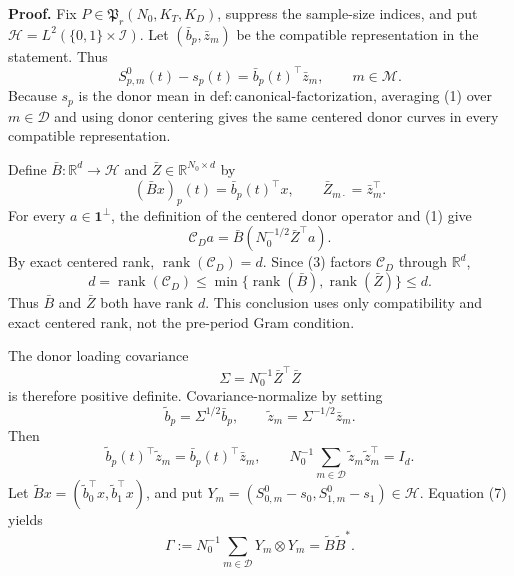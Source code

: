 \textbf{Proof.}
Fix \(P\in\mathfrak P_r(N_0,K_T,K_D)\), suppress the sample-size indices, and
put \(\mathcal H=L^2(\{0,1\}\times\mathcal I)\).  Let
\((\bar b_p,\bar z_m)\) be the compatible representation in the statement.  Thus
\[
 S^0_{p,m}(t)-s_p(t)=\bar b_p(t)^\top\bar z_m,
 \qquad m\in\mathcal M.                                   \tag{1}
\]
Because \(s_p\) is the donor mean in
\(\mathrm{def:canonical\mbox{-}factorization}\), averaging (1) over
\(m\in\mathcal D\) and using donor centering gives the same centered donor
curves in every compatible representation.

Define \(\bar B:\mathbb R^d\to\mathcal H\) and
\(\bar Z\in\mathbb R^{N_0\times d}\) by
\[
 (\bar Bx)_p(t)=\bar b_p(t)^\top x,
 \qquad \bar Z_{m\cdot}=\bar z_m^\top.                    \tag{2}
\]
For every \(a\in\mathbf 1^\perp\), the definition of the centered donor
operator and (1) give
\[
 \mathcal C_Da
 =\bar B\left(N_0^{-1/2}\bar Z^\top a\right).             \tag{3}
\]
By exact centered rank, \(\operatorname{rank}(\mathcal C_D)=d\).  Since (3)
factors \(\mathcal C_D\) through \(\mathbb R^d\),
\[
 d=\operatorname{rank}(\mathcal C_D)
 \leq\min\{\operatorname{rank}(\bar B),
             \operatorname{rank}(\bar Z)\}\leq d.        \tag{4}
\]
Thus \(\bar B\) and \(\bar Z\) both have rank \(d\).  This conclusion uses
only compatibility and exact centered rank, not the pre-period Gram condition.

The donor loading covariance
\[
 \Sigma=N_0^{-1}\bar Z^\top\bar Z                         \tag{5}
\]
is therefore positive definite.  Covariance-normalize by setting
\[
 \widetilde b_p=\Sigma^{1/2}\bar b_p,
 \qquad \widetilde z_m=\Sigma^{-1/2}\bar z_m.             \tag{6}
\]
Then
\[
 \widetilde b_p(t)^\top\widetilde z_m
 =\bar b_p(t)^\top\bar z_m,
 \qquad
 N_0^{-1}\sum_{m\in\mathcal D}
 \widetilde z_m\widetilde z_m^\top=I_d.                  \tag{7}
\]
Let \(\widetilde Bx=(\widetilde b_0^\top x,
\widetilde b_1^\top x)\), and put
\(Y_m=(S^0_{0,m}-s_0,S^0_{1,m}-s_1)\in\mathcal H\).  Equation (7) yields
\[
 \Gamma:=N_0^{-1}\sum_{m\in\mathcal D}Y_m\otimes Y_m
 =\widetilde B\widetilde B^*.                             \tag{8}
\]

